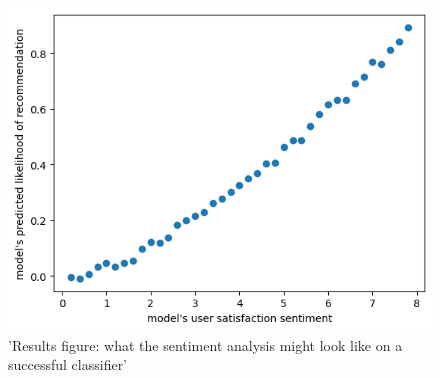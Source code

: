 \documentclass[acmtog]{acmart}
\begin{document}
\begin{figure}
\caption{'Results figure: what the sentiment analysis might look like on a successful
classifier'}
\includegraphics[scale=0.5]{plt3}
\end{figure}
\end{document}
